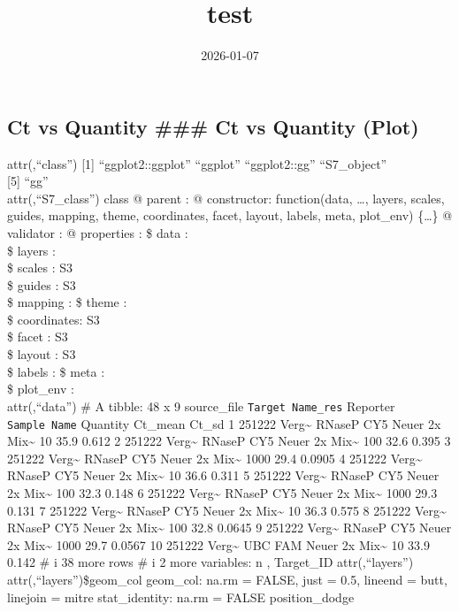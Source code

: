 \documentclass[
]{article}
\title{test}
\author{}
\date{\vspace{-2.5em}2026-01-07}
\begin{document}
\maketitle

\subsection{\texorpdfstring{Ct vs Quantity \n\n\#\#\# Ct vs Quantity
(Plot)
\n\n}{Ct vs Quantity \#\#\# Ct vs Quantity (Plot) }}\label{ct-vs-quantity-ct-vs-quantity-plot}

attr(,``class'') {[}1{]} ``ggplot2::ggplot'' ``ggplot'' ``ggplot2::gg''
``S7\_object''\\
{[}5{]} ``gg''\\
attr(,``S7\_class'') class @ parent : @ constructor: function(data,
\ldots, layers, scales, guides, mapping, theme, coordinates, facet,
layout, labels, meta, plot\_env) \{\ldots\} @ validator : @ properties :
\$ data : \\
\$ layers : \\
\$ scales : S3\\
\$ guides : S3\\
\$ mapping : \$ theme : \\
\$ coordinates: S3\\
\$ facet : S3\\
\$ layout : S3\\
\$ labels : \$ meta : \\
\$ plot\_env : \\
attr(,``data'') \# A tibble: 48 x 9 source\_file
\texttt{Target\ Name\_res} Reporter \texttt{Sample\ Name} Quantity
Ct\_mean Ct\_sd 1 251222 Verg\textasciitilde{} RNaseP CY5 Neuer 2x
Mix\textasciitilde{} 10 35.9 0.612 2 251222 Verg\textasciitilde{} RNaseP
CY5 Neuer 2x Mix\textasciitilde{} 100 32.6 0.395 3 251222
Verg\textasciitilde{} RNaseP CY5 Neuer 2x Mix\textasciitilde{} 1000 29.4
0.0905 4 251222 Verg\textasciitilde{} RNaseP CY5 Neuer 2x
Mix\textasciitilde{} 10 36.6 0.311 5 251222 Verg\textasciitilde{} RNaseP
CY5 Neuer 2x Mix\textasciitilde{} 100 32.3 0.148 6 251222
Verg\textasciitilde{} RNaseP CY5 Neuer 2x Mix\textasciitilde{} 1000 29.3
0.131 7 251222 Verg\textasciitilde{} RNaseP CY5 Neuer 2x
Mix\textasciitilde{} 10 36.3 0.575 8 251222 Verg\textasciitilde{} RNaseP
CY5 Neuer 2x Mix\textasciitilde{} 100 32.8 0.0645 9 251222
Verg\textasciitilde{} RNaseP CY5 Neuer 2x Mix\textasciitilde{} 1000 29.7
0.0567 10 251222 Verg\textasciitilde{} UBC FAM Neuer 2x
Mix\textasciitilde{} 10 33.9 0.142 \# i 38 more rows \# i 2 more
variables: n , Target\_ID attr(,``layers'') attr(,``layers'')\$geom\_col
geom\_col: na.rm = FALSE, just = 0.5, lineend = butt, linejoin = mitre
stat\_identity: na.rm = FALSE position\_dodge
\end{document}
